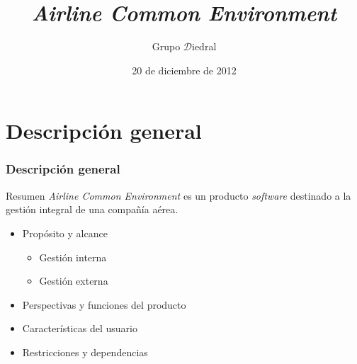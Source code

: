 \documentclass{beamer}
\institute{Universidad Complutense de Madrid}
\title[ACE]{\itshape Airline Common Environment}
\author{Grupo $\mathcal{D}$iedral}
\date{20 de diciembre de 2012}
\newcommand{\software}{\textit{software }}
\begin{document}
\maketitle

	
	\section{Descripción general}
	
\begin{frame}
	\frametitle{Descripción general}
	
	\begin{block}{Resumen}
		\textit{Airline Common Environment} es un producto \software destinado a la gestión integral de una compañía aérea.		\end{block}

	\begin{itemize}
		\item Propósito y alcance
			\begin{itemize}
				\item Gestión interna
				\item Gestión externa
			\end{itemize}
		\item Perspectivas y funciones del producto
		\item Características del usuario
		\item Restricciones y dependencias
	\end{itemize}
\end{frame}
\end{document}
